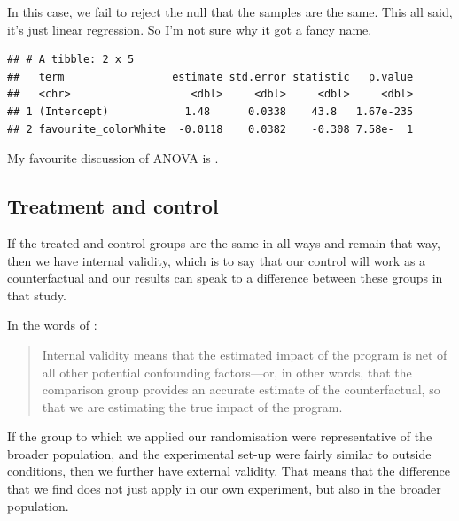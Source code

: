 \documentclass[
]{book}
\newenvironment{Shaded}{\begin{snugshade}}{\end{snugshade}}
\newcommand{\DataTypeTok}[1]{\textcolor[rgb]{0.13,0.29,0.53}{#1}}
\newcommand{\KeywordTok}[1]{\textcolor[rgb]{0.13,0.29,0.53}{\textbf{#1}}}
\newcommand{\NormalTok}[1]{#1}
\newcommand{\OperatorTok}[1]{\textcolor[rgb]{0.81,0.36,0.00}{\textbf{#1}}}
\newcommand{\StringTok}[1]{\textcolor[rgb]{0.31,0.60,0.02}{#1}}
\begin{document}
In this case, we fail to reject the null that the samples are the same. This all said, it's just linear regression. So I'm not sure why it got a fancy name.

\begin{Shaded}
\end{Shaded}

\begin{verbatim}
## # A tibble: 2 x 5
##   term                 estimate std.error statistic   p.value
##   <chr>                   <dbl>     <dbl>     <dbl>     <dbl>
## 1 (Intercept)            1.48      0.0338    43.8   1.67e-235
## 2 favourite_colorWhite  -0.0118    0.0382    -0.308 7.58e-  1
\end{verbatim}

My favourite discussion of ANOVA is \citep[Ch 8]{taback2020}.

\hypertarget{treatment-and-control}{%
\subsection{Treatment and control}\label{treatment-and-control}}

If the treated and control groups are the same in all ways and remain that way, then we have internal validity, which is to say that our control will work as a counterfactual and our results can speak to a difference between these groups in that study.

In the words of \citet[p.~71]{gertler2016impact}:

\begin{quote}
Internal validity means that the estimated impact of the program is net of all other potential confounding factors---or, in other words, that the comparison group provides an accurate estimate of the counterfactual, so that we are estimating the true impact of the program.
\end{quote}

If the group to which we applied our randomisation were representative of the broader population, and the experimental set-up were fairly similar to outside conditions, then we further have external validity. That means that the difference that we find does not just apply in our own experiment, but also in the broader population.
\end{document}
